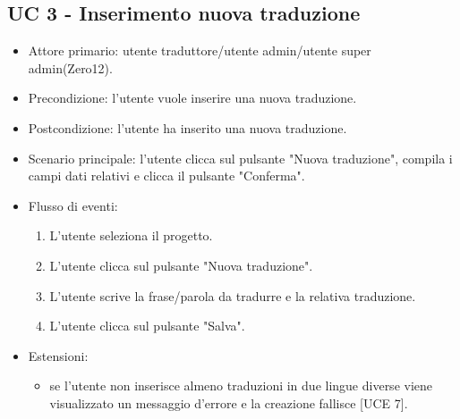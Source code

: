 \subsection{UC 3 - Inserimento nuova traduzione}
    \begin{itemize}
        \item Attore primario: utente traduttore/utente admin/utente super admin(Zero12).
        \item Precondizione: l'utente vuole inserire una nuova traduzione.
        \item Postcondizione: l'utente ha inserito una nuova traduzione.
        \item Scenario principale: l'utente clicca sul pulsante "Nuova traduzione", compila i campi dati relativi e clicca il pulsante "Conferma".
        \item Flusso di eventi:
            \begin{enumerate}
                \item L'utente seleziona il progetto.
                \item L'utente clicca sul pulsante "Nuova traduzione".
                \item L'utente scrive la frase/parola da tradurre e la relativa traduzione.
                \item L'utente clicca sul pulsante "Salva".
            \end{enumerate}
        \item Estensioni:
            \begin{itemize}
                \item se l'utente non inserisce almeno traduzioni in due lingue diverse viene visualizzato un messaggio d'errore e la creazione fallisce [UCE 7].
            \end{itemize}
    \end{itemize}
